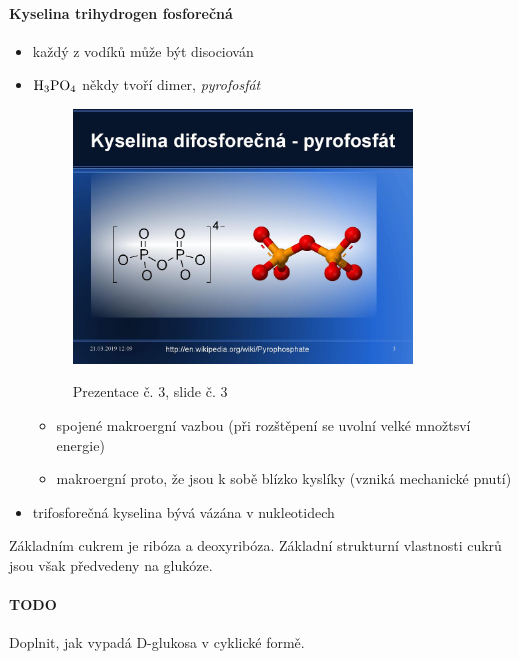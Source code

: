 \documentclass[DIV=8]{scrreprt}
\newcommand{\mybox}[2]{
    \paragraph{#1} #2
}
\begin{document}
\paragraph{Kyselina trihydrogen fosforečná}
\begin{itemize}[nosep]
    \item každý z vodíků může být disociován
    \item \(\ce{H3PO4}\) někdy tvoří dimer, \emph{pyrofosfát} \begin{figure}
    \caption{Prezentace č. 3, slide č. 3}
    \includegraphics[width=0.85\textwidth]{slides-3/slide-3.jpg}
    \centering
    \label{slides-3-slide-3}
\end{figure}

\begin{itemize}[nosep]
    \item spojené makroergní vazbou (při rozštěpení se uvolní velké množtsví energie)
    \item makroergní proto, že jsou k sobě blízko kyslíky (vzniká mechanické pnutí)
\end{itemize}

    \item trifosforečná kyselina bývá vázána v nukleotidech
\end{itemize}




Základním cukrem je ribóza a deoxyribóza. Základní strukturní vlastnosti cukrů jsou však předvedeny na glukóze.

\mybox{TODO}{Doplnit, jak vypadá D-glukosa v cyklické formě.}
\end{document}

